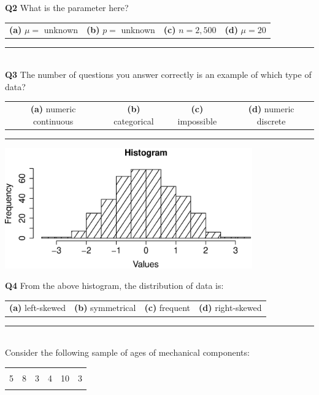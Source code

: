 \documentclass[12pt]{article}
\begin{document}
{\bf Q2} What is the parameter here?\\[0.2cm]
\begin{tabular}{cccc}
{\bf(a)} $\mu =$ unknown & {\bf(b)} $p =$ unknown & {\bf(c)} $n = 2,500$ & {\bf(d)} $\mu = 20$ \\[0.6cm]
\end{tabular}



\rule{\linewidth}{1pt}
\quad\\
{\bf Q3} The number of questions you answer correctly is an example of which type of data?\\[0.2cm]
\begin{tabular}{cccc}
{\bf(a)} numeric continuous & {\bf(b)} categorical & {\bf(c)} impossible & {\bf(d)} numeric discrete \\[0.6cm]
\end{tabular}


\rule{\linewidth}{1pt}
\begin{center}
\includegraphics[width=0.8\textwidth, trim = 0.0cm 0.6cm 1.5cm 0.8cm, clip]{Hist}
\end{center}
{\bf Q4} From the above histogram, the distribution of data is:\\[0.2cm]
\begin{tabular}{cccc}
{\bf(a)} left-skewed & {\bf(b)} symmetrical & {\bf(c)}  frequent   & {\bf(d)} right-skewed\\[0.6cm]
\end{tabular}


\rule{\linewidth}{1pt}

\quad\\
Consider the following sample of ages of mechanical components:
\begin{center}
\begin{tabular}{|cccccc|}
\hline
&&&&&\\[-0.4cm]
5 & 8 & 3 & 4 & 10 & 3\\
\hline
\multicolumn{6}{c}{}
\end{tabular}
\end{center}
\end{document}
